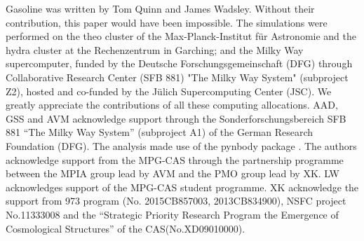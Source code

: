 \documentclass[useAMS,usenatbib]{mn2e}
\begin{document}
{\sc Gasoline} was written by Tom Quinn and James Wadsley. Without
their contribution, this paper would have been impossible.
%
The simulations were performed on the {\sc theo} cluster of the
Max-Planck-Institut f\"ur Astronomie and the {\sc hydra} cluster at
the Rechenzentrum in Garching; and the Milky Way supercomputer, funded
by the Deutsche Forschungsgemeinschaft (DFG) through Collaborative
Research Center (SFB 881) "The Milky Way System" (subproject Z2),
hosted and co-funded by the J\"ulich Supercomputing Center (JSC). We
greatly appreciate the contributions of all these computing
allocations.
%
AAD, GSS and AVM acknowledge support through the
Sonderforschungsbereich SFB 881 “The Milky Way System” (subproject A1)
of the German Research Foundation (DFG).  The analysis made use of the
pynbody package \citep{Pontzen13}.
%
The authors acknowledge support from the MPG-CAS through the
partnership programme between the MPIA group lead by AVM and the PMO
group lead by XK.
%
LW acknowledges support of the MPG-CAS student programme.
%
XK acknowledge the support from 973 program (No. 2015CB857003,
2013CB834900), NSFC project No.11333008 and the ``Strategic Priority
Research Program the Emergence of Cosmological Structures'' of the
CAS(No.XD09010000).


\end{document}
